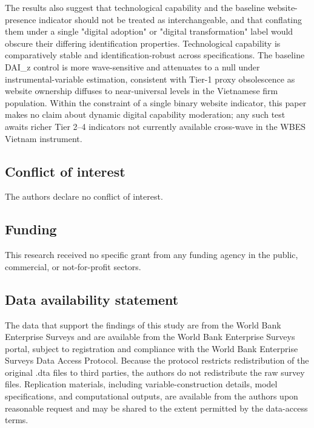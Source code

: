\documentclass[12pt,a4paper]{article}
\begin{document}
The results also suggest that technological capability and the baseline
website-presence indicator should not be treated as interchangeable, and
that conflating them under a single "digital adoption" or "digital
transformation" label would obscure their differing identification
properties. Technological capability is comparatively stable and
identification-robust across specifications. The baseline DAI\_z control
is more wave-sensitive and attenuates to a null under
instrumental-variable estimation, consistent with Tier-1 proxy
obsolescence as website ownership diffuses to near-universal levels in
the Vietnamese firm population. Within the constraint of a single binary
website indicator, this paper makes no claim about dynamic digital
capability moderation; any such test awaits richer Tier 2--4 indicators
not currently available cross-wave in the WBES Vietnam instrument.

\hypertarget{conflict-of-interest}{%
\subsection{Conflict of interest}\label{conflict-of-interest}}

The authors declare no conflict of interest.

\hypertarget{funding}{%
\subsection{Funding}\label{funding}}

This research received no specific grant from any funding agency in the
public, commercial, or not-for-profit sectors.

\hypertarget{data-availability-statement}{%
\subsection{Data availability
statement}\label{data-availability-statement}}

The data that support the findings of this study are from the World Bank
Enterprise Surveys and are available from the World Bank Enterprise
Surveys portal, subject to registration and compliance with the World
Bank Enterprise Surveys Data Access Protocol. Because the protocol
restricts redistribution of the original .dta files to third parties,
the authors do not redistribute the raw survey files. Replication
materials, including variable-construction details, model
specifications, and computational outputs, are available from the
authors upon reasonable request and may be shared to the extent
permitted by the data-access terms.
\end{document}
